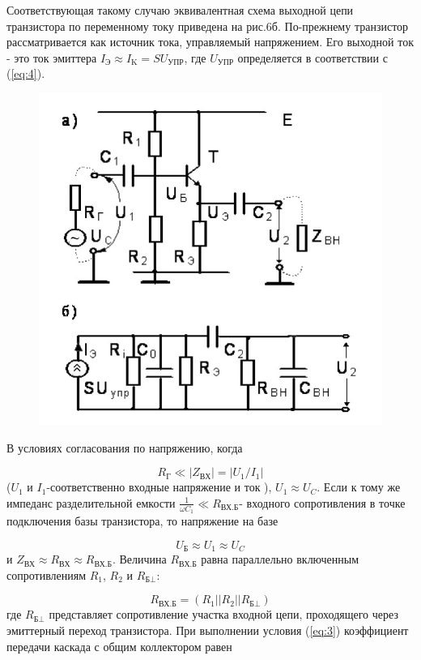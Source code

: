 Соответствующая такому случаю эквивалентная схема выходной цепи транзистора по переменному току приведена на рис.6б. По-прежнему транзистор рассматривается как источник тока, управляемый напряжением. Его выходной ток - это ток эмиттера $I_{\text{Э}} \approx I_{\text{K}}=SU_{\text{УПР}}$, где $U_{\text{УПР}}$ определяется в соответствии с (\ref{eq:4}).

\begin{figure}[h!]
	\centering
	\includegraphics[width=0.6\linewidth]{fig/fig6}
	\caption{}
	\label{fig:6}
\end{figure}

В условиях согласования по напряжению, когда

$$R_{\text{Г}} \ll |Z_{\text{ВХ}}|=|U_1/I_1|$$
($U_1$ и $I_1$-соответственно входные напряжение и ток ), $U_1 \approx U_C$. Если
к тому же импеданс разделительной емкости $\frac{1}{\omega C_1}\ll R_{\text{ВХ.Б}}$- входного сопротивления в точке подключения базы транзистора, то напряжение на базе

\begin{equation}
	U_{\text{Б}} \approx U_1 \approx U_C
	\label{eq:5}
\end{equation}
и $Z_{\text{ВХ}} \approx R_{\text{ВХ}} \approx R_{\text{ВХ.Б}}$. Величина $R_{\text{ВХ.Б}}$ равна параллельно включенным сопротивлениям $R_1$, $R_2$ и $R_{\text{Б} \bot}$:

\begin{equation}
	R_{\text{ВХ.Б}}=(R_1||R_2||R_{\text{Б} \bot})
	\label{eq:6}
\end{equation}
где $R_{\text{Б} \bot}$ представляет сопротивление участка входной цепи, проходящего через эмиттерный переход транзистора. При выполнении условия (\ref{eq:3}) коэффициент передачи каскада с общим коллектором равен 

